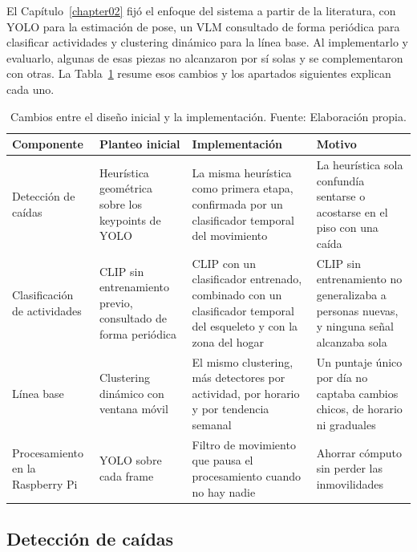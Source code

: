 El Capítulo~\ref{chapter02} fijó el enfoque del sistema a partir de la literatura, con YOLO para la estimación de pose, un VLM consultado de forma periódica para clasificar actividades y clustering dinámico para la línea base.
Al implementarlo y evaluarlo, algunas de esas piezas no alcanzaron por sí solas y se complementaron con otras.
La Tabla~\ref{tab:evolucion_diseno} resume esos cambios y los apartados siguientes explican cada uno.

\begin{table}[H]
\centering
\caption[Cambios entre el diseño inicial y la implementación.]{Cambios entre el diseño inicial y la implementación. Fuente: Elaboración propia.}
\label{tab:evolucion_diseno}
\small
\begin{tabular}{|p{2.4cm}|p{3.6cm}|p{4.2cm}|p{3.8cm}|}
\hline
\textbf{Componente} & \textbf{Planteo inicial} & \textbf{Implementación} & \textbf{Motivo} \\
\hline
Detección de caídas & Heurística geométrica sobre los keypoints de YOLO \parencite{Giri2025} & La misma heurística como primera etapa, confirmada por un clasificador temporal del movimiento & La heurística sola confundía sentarse o acostarse en el piso con una caída \\
\hline
Clasificación de actividades & CLIP sin entrenamiento previo, consultado de forma periódica & CLIP con un clasificador entrenado, combinado con un clasificador temporal del esqueleto y con la zona del hogar & CLIP sin entrenamiento no generalizaba a personas nuevas, y ninguna señal alcanzaba sola \\
\hline
Línea base & Clustering dinámico con ventana móvil \parencite{Snoun2024} & El mismo clustering, más detectores por actividad, por horario y por tendencia semanal & Un puntaje único por día no captaba cambios chicos, de horario ni graduales \\
\hline
Procesamiento en la Raspberry Pi & YOLO sobre cada frame & Filtro de movimiento que pausa el procesamiento cuando no hay nadie & Ahorrar cómputo sin perder las inmovilidades \\
\hline
\end{tabular}
\end{table}

\subsection{Detección de caídas}

